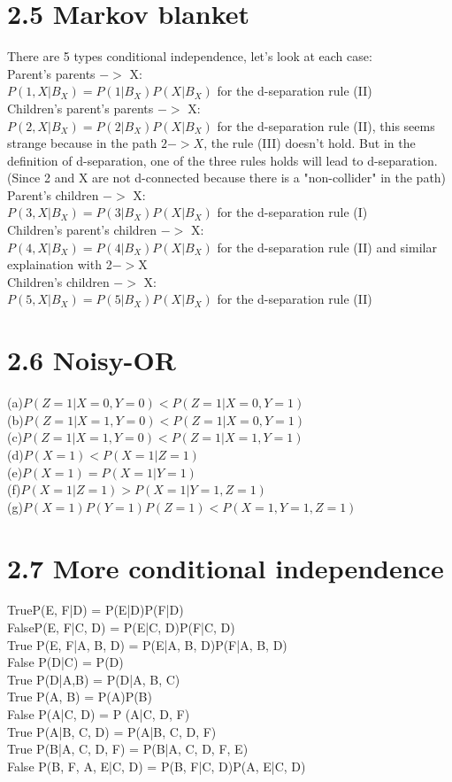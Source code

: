 \documentclass [11pt, a4paper, oneside] {article}
\begin{document}
\section *{2.5 Markov blanket}
There are 5 types conditional independence, let's look at each case:\\
Parent's parents $->$ X:\\
$P(1, X|B_X) = P(1|B_X)P(X|B_X)$ for the d-separation rule (II)\\
Children's parent's parents $->$ X:\\
$P(2, X|B_X) = P(2|B_X)P(X|B_X)$ for the d-separation rule (II), this seems strange because in the path $2->X$, the rule (III) doesn't hold. But in the definition of d-separation, one of the three rules holds will lead to d-separation. (Since 2 and X are not d-connected because there is a "non-collider" in the path)\\
Parent's children $->$ X:\\
$P(3, X|B_X) = P(3|B_X)P(X|B_X)$ for the d-separation rule (I)\\
Children's parent's children $->$ X:\\
$P(4, X|B_X) = P(4|B_X)P(X|B_X)$ for the d-separation rule (II) and similar explaination with 2$->$X\\
Children's children $->$ X:\\
$P(5, X|B_X) = P(5|B_X)P(X|B_X)$ for the d-separation rule (II)\\
\section *{2.6 Noisy-OR}
(a)$P(Z=1|X=0, Y=0) < P(Z=1|X=0, Y=1)$\\
(b)$P(Z=1|X=1, Y=0) < P(Z=1|X=0, Y=1)$\\
(c)$P(Z=1|X=1, Y=0) < P(Z=1|X=1, Y=1)$\\
(d)$P(X=1) < P(X=1|Z=1)$\\
(e)$P(X=1) = P(X=1|Y=1)$\\
(f)$P(X=1|Z=1) > P(X=1|Y=1, Z=1)$\\
(g)$P(X=1)P(Y=1)P(Z=1) < P(X=1, Y=1, Z=1)$\\
\section *{2.7 More conditional independence}
True\qquad P(E, F|D) = P(E|D)P(F|D) \\
False\qquad P(E, F|C, D) = P(E|C, D)P(F|C, D)\\
True \qquad P(E, F|A, B, D) = P(E|A, B, D)P(F|A, B, D)\\
False \qquad P(D|C) = P(D)\\
True \qquad P(D|A,B) = P(D|A, B, C)\\
True \qquad P(A, B) = P(A)P(B)\\
False \qquad P(A|C, D) = P (A|C, D, F)\\
True \qquad P(A|B, C, D) = P(A|B, C, D, F)\\
True \qquad P(B|A, C, D, F) = P(B|A, C, D, F, E)\\
False \qquad P(B, F, A, E|C, D) = P(B, F|C, D)P(A, E|C, D)\\
\end{document}
